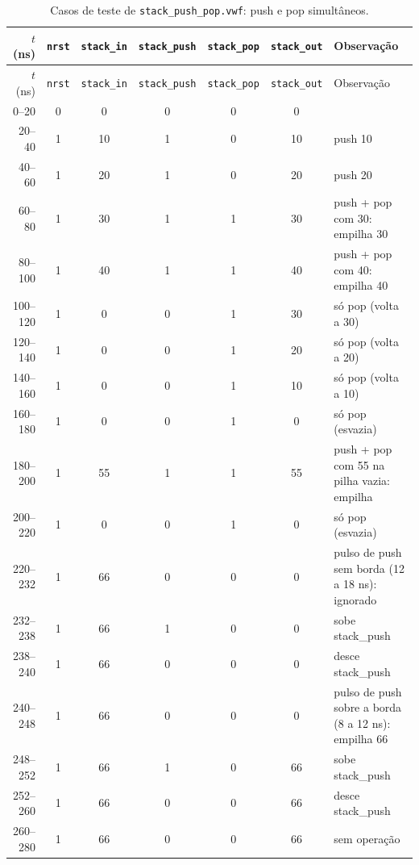 {\scriptsize\setlength{\tabcolsep}{3pt}
\begin{longtable}{rcccccp{5.7cm}}
\caption{Casos de teste de \texttt{stack\_push\_pop.vwf}: push e pop simultâneos.}
\label{tab:caso-stack-push-pop}\\
\hline $t$ (ns) & \texttt{nrst} & \texttt{stack\_in} & \texttt{stack\_push} & \texttt{stack\_pop} & \texttt{stack\_out} & Observação \\ \hline \endfirsthead
\hline $t$ (ns) & \texttt{nrst} & \texttt{stack\_in} & \texttt{stack\_push} & \texttt{stack\_pop} & \texttt{stack\_out} & Observação \\ \hline \endhead
0--20 & 0 & 0 & 0 & 0 & 0 &  \\
20--40 & 1 & 10 & 1 & 0 & 10 & push 10 \\
40--60 & 1 & 20 & 1 & 0 & 20 & push 20 \\
60--80 & 1 & 30 & 1 & 1 & 30 & push + pop com 30: empilha 30 \\
80--100 & 1 & 40 & 1 & 1 & 40 & push + pop com 40: empilha 40 \\
100--120 & 1 & 0 & 0 & 1 & 30 & só pop (volta a 30) \\
120--140 & 1 & 0 & 0 & 1 & 20 & só pop (volta a 20) \\
140--160 & 1 & 0 & 0 & 1 & 10 & só pop (volta a 10) \\
160--180 & 1 & 0 & 0 & 1 & 0 & só pop (esvazia) \\
180--200 & 1 & 55 & 1 & 1 & 55 & push + pop com 55 na pilha vazia: empilha \\
200--220 & 1 & 0 & 0 & 1 & 0 & só pop (esvazia) \\
220--232 & 1 & 66 & 0 & 0 & 0 & pulso de push sem borda (12 a 18 ns): ignorado \\
232--238 & 1 & 66 & 1 & 0 & 0 & sobe stack\_push \\
238--240 & 1 & 66 & 0 & 0 & 0 & desce stack\_push \\
240--248 & 1 & 66 & 0 & 0 & 0 & pulso de push sobre a borda (8 a 12 ns): empilha 66 \\
248--252 & 1 & 66 & 1 & 0 & 66 & sobe stack\_push \\
252--260 & 1 & 66 & 0 & 0 & 66 & desce stack\_push \\
260--280 & 1 & 66 & 0 & 0 & 66 & sem operação \\
\hline
\end{longtable}}
\vspace{-0.9cm}
